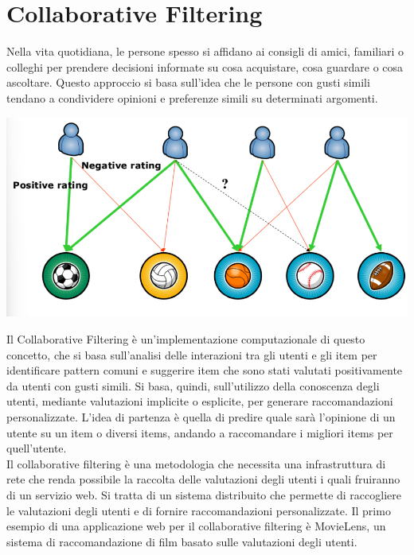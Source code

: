 \documentclass{report}
\begin{document}
	\section{Collaborative Filtering}
	Nella vita quotidiana, le persone spesso si affidano ai consigli di amici, familiari o colleghi per prendere decisioni informate su cosa acquistare, cosa guardare o cosa ascoltare. Questo approccio si basa sull'idea che le persone con gusti simili tendano a condividere opinioni e preferenze simili su determinati argomenti.
	\begin{center}
		\includegraphics[scale=0.4]{assets/cf-idea.png}
	\end{center}
	Il Collaborative Filtering è un'implementazione computazionale di questo concetto, che si basa sull'analisi delle interazioni tra gli utenti e gli item per identificare pattern comuni e suggerire item che sono stati valutati positivamente da utenti con gusti simili. Si basa, quindi, sull'utilizzo della conoscenza degli utenti, mediante valutazioni implicite o esplicite, per generare raccomandazioni personalizzate. L'idea di partenza è quella di predire quale sarà l'opinione di un utente su un item o diversi items, andando a raccomandare i migliori items per quell'utente.
	\vspace{\baselineskip}\\
	Il collaborative filtering è una metodologia che necessita una infrastruttura di rete che renda possibile la raccolta delle valutazioni degli utenti i quali fruiranno di un servizio web. Si tratta di un sistema distribuito che permette di raccogliere le valutazioni degli utenti e di fornire raccomandazioni personalizzate. Il primo esempio di una applicazione web per il collaborative filtering è MovieLens, un sistema di raccomandazione di film basato sulle valutazioni degli utenti.  
	
\end{document}
